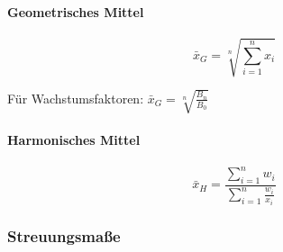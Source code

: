 \documentclass[10pt]{article}
\begin{document}
\begin{multicols}{2}
\paragraph{Geometrisches Mittel}

$$\bar{x}_G=\sqrt[n]{\sum\limits_{i=1}^n x_i} $$

\noindent Für Wachstumsfaktoren: $\bar{x}_G=\sqrt[n]{\frac{B_n}{B_0}}$

\paragraph{Harmonisches Mittel}

$$\bar{x}_H=\frac{\sum\limits_{i=1}^n w_i}{\sum\limits_{i=1}^n \frac{w_i}{x_i}}$$

\end{multicols}
\subsubsection{Streuungsmaße}
\end{document}
